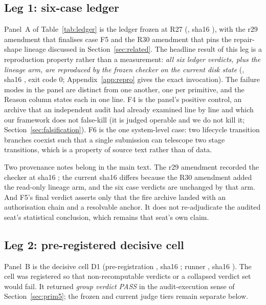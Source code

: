\documentclass{article}
\begin{document}
\subsection{Leg 1: six-case ledger}
\label{sec:leg1}

Panel~A of Table~\ref{tab:ledger} is the ledger frozen at R27
(, sha16 ), with the r29
amendment that finalises case F5 and the R30 amendment that pins the repair-shape lineage
discussed in Section~\ref{sec:related}. The headline result of this leg is a reproduction
property rather than a measurement: \emph{all six ledger verdicts, plus the lineage arm,
are reproduced by the frozen checker on the current disk state}
(, sha16 , exit code $0$;
Appendix~\ref{app:repro} gives the exact invocation). The failure modes in the panel are
distinct from one another, one per primitive, and the Reason column states each in one
line. F4 is the panel's positive control, an archive that an independent audit had already
examined line by line and which our framework does not false-kill (it is judged operable
and we do not kill it; Section~\ref{sec:falsification}). F6 is the one
system-level case: two lifecycle
transition branches coexist such that a single submission can telescope two stage
transitions, which is a property of source text rather than of data.

Two provenance notes belong in the main text. The r29 amendment recorded the checker at
sha16 ; the current sha16 differs because the R30 amendment added
the read-only lineage arm, and the six case verdicts are unchanged by that arm. And F5's
final verdict asserts only that the fire archive landed with an authorisation chain and a
resolvable anchor. It does not re-adjudicate the audited seat's statistical conclusion,
which remains that seat's own claim.

\subsection{Leg 2: pre-registered decisive cell}
\label{sec:leg2}

Panel~B is the decisive cell D1 (pre-registration
, sha16 ; runner
, sha16 ). The cell was registered so
that non-recomputable verdicts or a collapsed verdict set would fail. It returned
\emph{group verdict PASS} in the audit-execution sense of Section~\ref{sec:prim5}; the frozen
and current judge tiers remain separate below.
\end{document}
